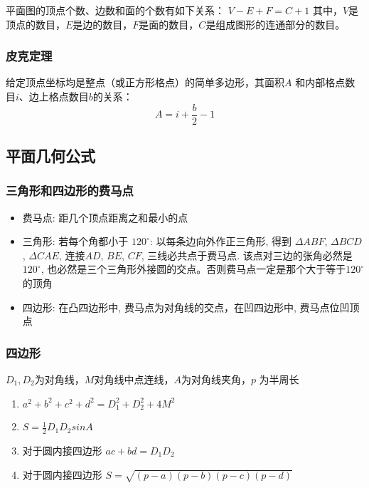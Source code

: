 \documentclass[landscape,a4paper]{article}
\begin{document}
\begin{spacing}{0.3}
\begin{multicols}{2}
平面图的顶点个数、边数和面的个数有如下关系：
	$V - E + F = C+ 1$
\indent 其中，$V$是顶点的数目，$E$是边的数目，$F$是面的数目，$C$是组成图形的连通部分的数目。

\subsubsection{皮克定理}

给定顶点坐标均是整点（或正方形格点）的简单多边形，其面积$A$ 和内部格点数目$i$、边上格点数目$b$的关系：
	$$A = i + \frac{b}{2} - 1$$


\subsection{平面几何公式}
\subsubsection{三角形和四边形的费马点}
  \begin{itemize}
  \item 费马点: 距几个顶点距离之和最小的点
  \item 三角形:
      若每个角都小于 $120^{\circ}$: 以每条边向外作正三角形, 得到 $\Delta ABF$, $\Delta BCD$, $\Delta CAE$, 连接$AD$, $BE$, $CF$, 三线必共点于费马点. 该点对三边的张角必然是$120^{\circ}$, 也必然是三个三角形外接圆的交点。否则费马点一定是那个大于等于$120^{\circ}$的顶角
  \item 四边形:
        在凸四边形中, 费马点为对角线的交点，在凹四边形中, 费马点位凹顶点
\end{itemize}
\subsubsection{四边形}

$D_1, D_2$为对角线，$M$对角线中点连线，$A$为对角线夹角，$p$ 为半周长
\begin{enumerate}
	\item $a^2+b^2+c^2+d^2=D_1^2+D_2^2+4M^2$
	\item $S=\frac{1}{2}D_1D_2sinA$
	\item 对于圆内接四边形
		$ac+bd=D_1D_2$
	\item 对于圆内接四边形
		$S=\sqrt{(p-a)(p-b)(p-c)(p-d)}$
\end{enumerate}


\end{multicols}
\end{spacing}
\end{document}
